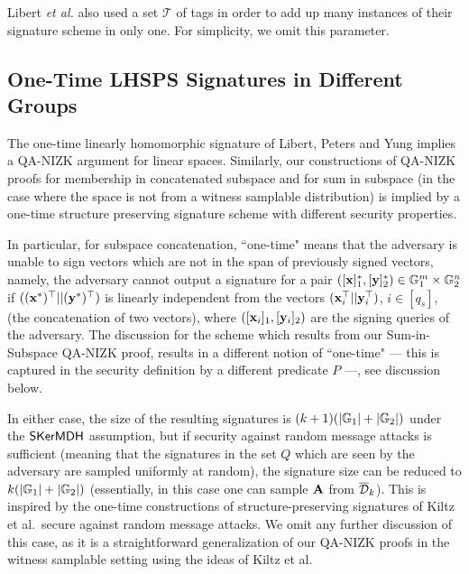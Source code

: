 Libert \textit{et al.} also used a set $\mathcal{T}$ of tags in order to add up many instances of their signature scheme
in only one. For simplicity, we omit this parameter.


\subsection{One-Time LHSPS Signatures in Different Groups} \label{sec:newhomtwogroups}

The one-time linearly homomorphic signature of Libert, Peters and Yung \cite{EC:LPJY14}  implies a QA-NIZK argument for linear spaces. Similarly, our constructions of QA-NIZK proofs for membership in concatenated subspace and for sum in subspace (in the case where the space is not from a witness samplable distribution) is implied by a one-time structure preserving signature scheme with different security properties. 

In particular, for subspace concatenation, ``one-time" means that the adversary is unable to sign vectors which are not in the span of previously signed vectors, namely,
the adversary cannot output a signature for a pair
$([\mathbf{x}]_1^*,[\mathbf{y}]_2^*) \in \mathbb{G}_1^{m} \times \mathbb{G}_2^{n}$ if $((\mathbf{x}^*)^{\top}||(\mathbf{y}^*)^{\top})$ is
linearly independent from the 
vectors $(\mathbf{x}_i^{\top}||\mathbf{y}_i^{\top})$, $i \in [q_s]$, (the concatenation of two vectors), where $([\mathbf{x}_i]_1,[\mathbf{y}_i]_2)$ are the signing queries of the adversary. The discussion for the scheme which results from our 
Sum-in-Subspace QA-NIZK proof, results in a different notion of ``one-time" --- this is captured in the security definition by a different predicate $P$ ---, see discussion below. 

In either case, the size of the resulting signatures is $(k+1)(|\mathbb{G}_1|+|\mathbb{G}_2|)$ under the $\mathsf{SKerMDH}$ assumption, but if security against random message attacks is sufficient (meaning that the signatures in the set $Q$ which are seen by the adversary are sampled uniformly at random), the signature size can be reduced to $k(|\mathbb{G}_1|+|\mathbb{G}_2|)$ (essentially, in this case one can sample $\mathbf{{A}}$ from $\overline{\mathcal{D}}_k$). This is inspired by the one-time constructions of structure-preserving signatures of Kiltz et al.~secure against random message attacks\cite{C:KilPanWee15}. 
 We omit any further discussion of this case, as it is a straightforward generalization of our QA-NIZK proofs in the witness samplable setting using the ideas of Kiltz et al. 




